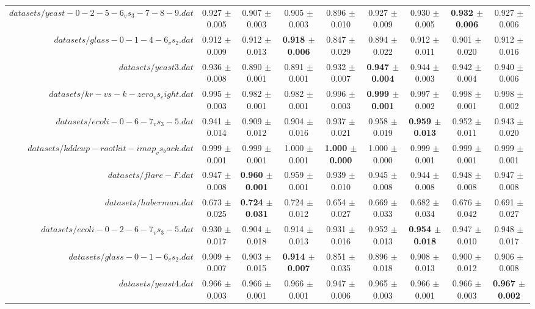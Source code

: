 \begin{table}[!ht]
{\begin{tabular}{r c c c c c c c c}
$datasets/yeast-0-2-5-6_vs_3-7-8-9.dat$ & 0.927 $\pm$ 0.005 & 0.907 $\pm$ 0.003 & 0.905 $\pm$ 0.003 & 0.896 $\pm$ 0.010 & 0.927 $\pm$ 0.009 & 0.930 $\pm$ 0.005 & \textbf{0.932 $\pm$ 0.006} & 0.927 $\pm$ 0.006 \\
$datasets/glass-0-1-4-6_vs_2.dat$ & 0.912 $\pm$ 0.009 & 0.912 $\pm$ 0.013 & \textbf{0.918 $\pm$ 0.006} & 0.847 $\pm$ 0.029 & 0.894 $\pm$ 0.022 & 0.912 $\pm$ 0.011 & 0.901 $\pm$ 0.020 & 0.912 $\pm$ 0.016 \\
$datasets/yeast3.dat$ & 0.936 $\pm$ 0.008 & 0.890 $\pm$ 0.001 & 0.891 $\pm$ 0.001 & 0.932 $\pm$ 0.007 & \textbf{0.947 $\pm$ 0.004} & 0.944 $\pm$ 0.003 & 0.942 $\pm$ 0.004 & 0.940 $\pm$ 0.006 \\
$datasets/kr-vs-k-zero_vs_eight.dat$ & 0.995 $\pm$ 0.003 & 0.982 $\pm$ 0.001 & 0.982 $\pm$ 0.001 & 0.996 $\pm$ 0.003 & \textbf{0.999 $\pm$ 0.001} & 0.997 $\pm$ 0.002 & 0.998 $\pm$ 0.001 & 0.998 $\pm$ 0.002 \\
$datasets/ecoli-0-6-7_vs_3-5.dat$ & 0.941 $\pm$ 0.014 & 0.909 $\pm$ 0.012 & 0.904 $\pm$ 0.016 & 0.937 $\pm$ 0.021 & 0.958 $\pm$ 0.019 & \textbf{0.959 $\pm$ 0.013} & 0.952 $\pm$ 0.011 & 0.943 $\pm$ 0.020 \\
$datasets/kddcup-rootkit-imap_vs_back.dat$ & 0.999 $\pm$ 0.001 & 0.999 $\pm$ 0.001 & 1.000 $\pm$ 0.001 & \textbf{1.000 $\pm$ 0.000} & 1.000 $\pm$ 0.000 & 0.999 $\pm$ 0.001 & 0.999 $\pm$ 0.001 & 0.999 $\pm$ 0.001 \\
$datasets/flare-F.dat$ & 0.947 $\pm$ 0.008 & \textbf{0.960 $\pm$ 0.001} & 0.959 $\pm$ 0.001 & 0.939 $\pm$ 0.010 & 0.945 $\pm$ 0.008 & 0.944 $\pm$ 0.008 & 0.948 $\pm$ 0.008 & 0.947 $\pm$ 0.008 \\
$datasets/haberman.dat$ & 0.673 $\pm$ 0.025 & \textbf{0.724 $\pm$ 0.031} & 0.724 $\pm$ 0.012 & 0.654 $\pm$ 0.027 & 0.669 $\pm$ 0.033 & 0.682 $\pm$ 0.034 & 0.676 $\pm$ 0.042 & 0.691 $\pm$ 0.027 \\
$datasets/ecoli-0-2-6-7_vs_3-5.dat$ & 0.930 $\pm$ 0.017 & 0.904 $\pm$ 0.018 & 0.914 $\pm$ 0.013 & 0.931 $\pm$ 0.016 & 0.952 $\pm$ 0.013 & \textbf{0.954 $\pm$ 0.018} & 0.947 $\pm$ 0.010 & 0.948 $\pm$ 0.017 \\
$datasets/glass-0-1-6_vs_2.dat$ & 0.909 $\pm$ 0.007 & 0.903 $\pm$ 0.015 & \textbf{0.914 $\pm$ 0.007} & 0.851 $\pm$ 0.035 & 0.896 $\pm$ 0.018 & 0.908 $\pm$ 0.013 & 0.900 $\pm$ 0.012 & 0.906 $\pm$ 0.008 \\
$datasets/yeast4.dat$ & 0.966 $\pm$ 0.003 & 0.966 $\pm$ 0.001 & 0.966 $\pm$ 0.001 & 0.947 $\pm$ 0.006 & 0.965 $\pm$ 0.003 & 0.966 $\pm$ 0.001 & 0.966 $\pm$ 0.003 & \textbf{0.967 $\pm$ 0.002} \\

\end{tabular}}
\end{table}
